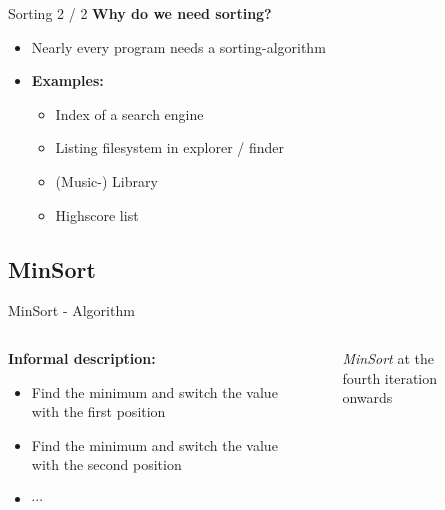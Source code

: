 \documentclass[notes=hide,pdftex,14pt]{beamer}
\begin{document}

\begin{frame}{Sorting 2 / 2}
  \textbf{Why do we need sorting?}
  \begin{itemize}
    \item
      Nearly {\color{Mittel-Blau}every} program needs a sorting-algorithm
    \item
      \textbf{Examples:}
      \begin{itemize}
        \item
          Index of a search engine
        \item
          Listing filesystem in explorer / finder
        \item
          (Music-) Library
        \item
          Highscore list
      \end{itemize}
  \end{itemize}
\end{frame}\subsection{MinSort}


\begin{frame}{MinSort - Algorithm}
  \begin{columns}
    \begin{column}{0.5\textwidth}
      \textbf{Informal description:}
      \begin{itemize}
        \item
          Find the minimum and switch the value with the
          {\color{Mittel-Blau}first} position
        \item
          Find the minimum and switch the value with the
          {\color{Mittel-Blau}second} position
        \item
          $\cdots$
      \end{itemize}
    \end{column}
    \begin{column}{0.5\textwidth}
      \begin{figure}[!h]%
        \begin{adjustbox}{width=\linewidth}
%
%
%
%
%
%
%
%
%
{}%
        \end{adjustbox}
        \caption{\textit{MinSort} at the fourth iteration onwards}%
        \label{fig:minsort_fourth_iteration}%
      \end{figure}%
    \end{column}
  \end{columns}
\end{frame}
\end{document}
